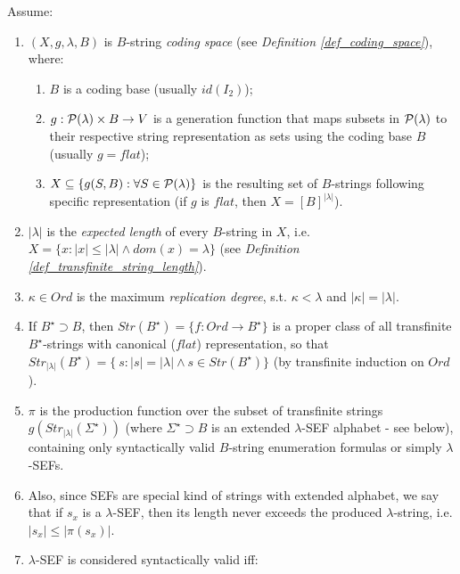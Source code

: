 \begin{definition}\label{def_trans_replicata}
    Assume:
    \begin{enumerate}
        \item $(X, g, \lambda, B)$ is $B$-string \textit{coding space} (see \textit{Definition \ref{def_coding_space}}), where:
        \begin{enumerate}[label=(\roman*)]
            \item $B$ is a coding base (usually $id(I_2)$);
            \item $g: \mathcal{P}(\lambda) \times B \to V$ is a generation function that maps subsets in $\mathcal{P}(\lambda)$ to their respective string representation as sets using the coding base $B$ (usually $g = flat$);
            \item $X \subseteq \{ g(S, B) : \forall S \in \mathcal{P}(\lambda)\}$ is the resulting set of $B$-strings following specific representation (if $g$ is $flat$, then $X = [B]^{|\lambda|}$).
        \end{enumerate}
        \item $|\lambda|$ is the \textit{expected length} of every $B$-string in $X$, i.e. $X = \{x : |x| \leq |\lambda| \land dom(x) = \lambda \}$ (see \textit{Definition \ref{def_transfinite_string_length}}).
        \item $\kappa \in Ord$ is the maximum \textit{replication degree}, s.t. $\kappa < \lambda$ and $|\kappa| = |\lambda|$.
        \item If $B^\star \supset B$, then $Str(B^\star) = \{f : Ord \to B^\star \}$ is a proper class of all transfinite $B^\star$-strings with canonical ($flat$) representation, so that $Str_{|\lambda|}(B^\star) = \{\ s : |s| = |\lambda| \land s \in Str(B^\star)\}$ (by transfinite induction on $Ord$).
        \item $\pi$ is the production function over the subset of transfinite strings $g(Str_{|\lambda|}(\Sigma^\star))$ (where $\Sigma^\star \supset B$ is an extended $\lambda$-SEF alphabet - see below), containing only syntactically valid $B$-string enumeration formulas or simply $\lambda$-SEFs.
        \item Also, since SEFs are special kind of strings with extended alphabet, we say that if $s_x$ is a $\lambda$-SEF, then its length never exceeds the produced $\lambda$-string, i.e. $|s_x| \leq |\pi(s_x)|$.
        \item $\lambda$-SEF is considered syntactically valid iff: 
        \begin{itemize}

\end{itemize}
\end{enumerate}
\end{definition}
